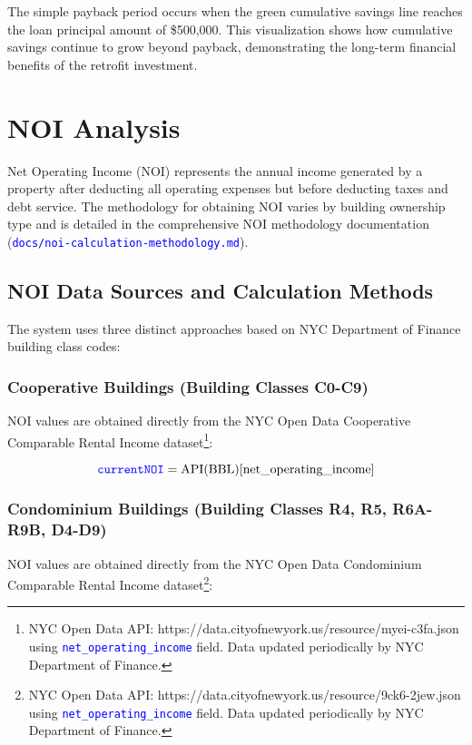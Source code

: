 \documentclass{article}
\newcommand{\code}[1]{\textcolor{blue}{\texttt{#1}}}
\begin{document}
The simple payback period occurs when the green cumulative savings line reaches the loan principal amount of \$500,000. This visualization shows how cumulative savings continue to grow beyond payback, demonstrating the long-term financial benefits of the retrofit investment.

\section{NOI Analysis}

Net Operating Income (NOI) represents the annual income generated by a property after deducting all operating expenses but before deducting taxes and debt service. The methodology for obtaining NOI varies by building ownership type and is detailed in the comprehensive NOI methodology documentation (\code{docs/noi-calculation-methodology.md}).

\subsection{NOI Data Sources and Calculation Methods}

The system uses three distinct approaches based on NYC Department of Finance building class codes:

\subsubsection{Cooperative Buildings (Building Classes C0-C9)}
NOI values are obtained directly from the NYC Open Data Cooperative Comparable Rental Income dataset\footnote{NYC Open Data API: https://data.cityofnewyork.us/resource/myei-c3fa.json using \code{net\_operating\_income} field. Data updated periodically by NYC Department of Finance.}:

\begin{equation}
\code{currentNOI} = \text{API}(\text{BBL})[\text{net\_operating\_income}]
\end{equation}

\subsubsection{Condominium Buildings (Building Classes R4, R5, R6A-R9B, D4-D9)}
NOI values are obtained directly from the NYC Open Data Condominium Comparable Rental Income dataset\footnote{NYC Open Data API: https://data.cityofnewyork.us/resource/9ck6-2jew.json using \code{net\_operating\_income} field. Data updated periodically by NYC Department of Finance.}:
\end{document}
